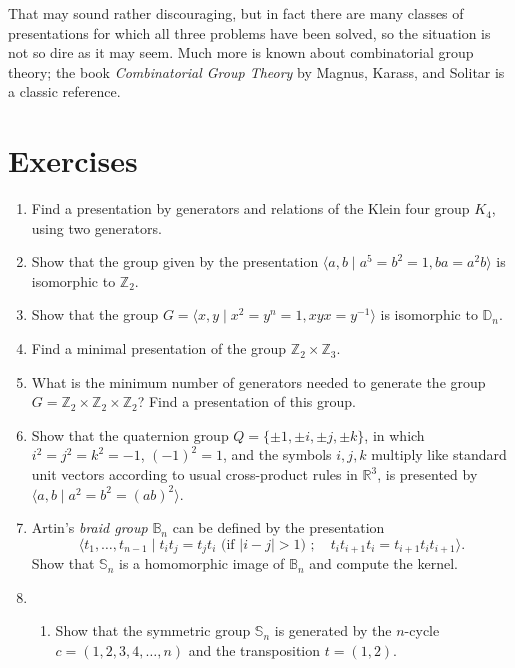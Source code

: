 \documentclass[11pt,oneside]{article}
\newenvironment{problems}
{
 \begin{enumerate}[topsep=1pt,itemsep=0pt,parsep=2pt,leftmargin=0.6cm,%
 label={\arabic*.}, ref=\arabic*] \small
}
{
 \end{enumerate}
}
\theoremstyle{definition}
\newcommand{\R}{\mathbb{R}} %
\newcommand{\Z}{\mathbb{Z}} %
\newcommand{\gen}[1]{\langle #1 \rangle}
\newcommand{\Sym}{\mathbb{S}}
\newcommand{\D}{\mathbb{D}}
\begin{document}
That may sound rather discouraging, but in fact there are many classes
of presentations for which all three problems have been solved, so the
situation is not so dire as it may seem. Much more is known about
combinatorial group theory; the
book \emph{Combinatorial Group Theory} by Magnus, Karass, and Solitar
is a classic reference.


\section*{Exercises}
\begin{problems}
  
\item Find a presentation by generators and relations of the Klein
  four group $K_4$, using two generators. 

\item Show that the group given by the presentation $\gen{a,b \mid a^5
  = b^2 = 1, ba = a^2b}$ is isomorphic to $\Z_2$.

\item Show that the group $G = \gen{x,y \mid x^2=y^n = 1, xyx =
  y^{-1}}$ is isomorphic to $\D_n$.

\item Find a minimal presentation of the group $\Z_2 \times \Z_3$.

\item What is the minimum number of generators needed to generate the
  group $G = \Z_2 \times \Z_2 \times \Z_2$? Find a presentation of
  this group.

\item Show that the quaternion group
  $Q = \{\pm 1, \pm i, \pm j, \pm k \}$, in which $i^2=j^2=k^2 = -1$,
  $(-1)^2 = 1$, and the symbols $i,j,k$ multiply like standard unit
  vectors according to usual cross-product rules in $\R^3$, is
  presented by $\gen{ a,b \mid a^2=b^2 = (ab)^2 }$.

\item{} Artin's \emph{braid group} $\mathbb{B}_n$ can
  be defined by the presentation
  $$\gen{t_1, \dots, t_{n-1} \mid t_it_j=t_jt_i \text{ (if $|i-j|>1$)
    }; \quad t_it_{i+1}t_i= t_{i+1}t_it_{i+1} }.$$ Show that $\Sym_n$
  is a homomorphic image of $\mathbb{B}_n$ and compute the kernel.

\item 
\begin{enumerate}
  \item Show that the symmetric group $\Sym_n$ is generated by the
    $n$-cycle $c = (1,2,3,4,\dots,n)$ and the transposition $t =
    (1,2)$.


\end{enumerate}
\end{problems}
\end{document}
